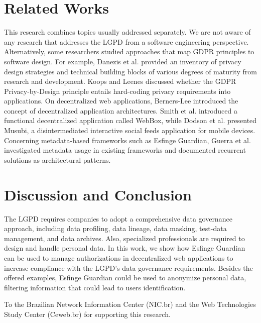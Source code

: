 \documentclass[sigconf]{acmart}
\begin{document}
\section{Related Works}

This research combines topics usually addressed separately. We are not aware of any research that addresses the LGPD from a software engineering perspective. Alternatively, some researchers studied approaches that map GDPR principles to software design. For example, Danezis et al. \cite{Ed2014} provided an inventory of privacy design strategies and technical building blocks of various degrees of maturity from research and development. Koops and Leenes \cite{Koops2014} discussed whether the GDPR Privacy-by-Design principle entails hard-coding privacy requirements into applications. On decentralized web applications, Berners-Lee \cite{Bern09} introduced the concept of decentralized application architectures. Smith et al. \cite{Smith2012} introduced a functional decentralized application called WebBox, while Dodson et al. \cite{Dodson2012} presented Musubi, a disintermediated interactive social feeds application for mobile devices. Concerning metadata-based frameworks such as Esfinge Guardian, Guerra et al. \cite{Guerra2010} investigated metadata usage in existing frameworks and documented recurrent solutions as architectural patterns.

\section{Discussion and Conclusion}

The LGPD requires companies to adopt a comprehensive data governance approach, including data profiling, data lineage, data masking, test-data management, and data archives. Also, specialized professionals are required to design and handle personal data. In this work, we show how Esfinge Guardian can be used to manage authorizations in decentralized web applications to increase compliance with the LGPD's data governance requirements. Besides the offered examples, Esfinge Guardian could be used to anonymize personal data, filtering information that could lead to users identification.

%
\begin{acks}
To the Brazilian Network Information Center (NIC.br) and the Web Technologies Study Center (Ceweb.br) for supporting this research.
\end{acks}

%


\end{document}

